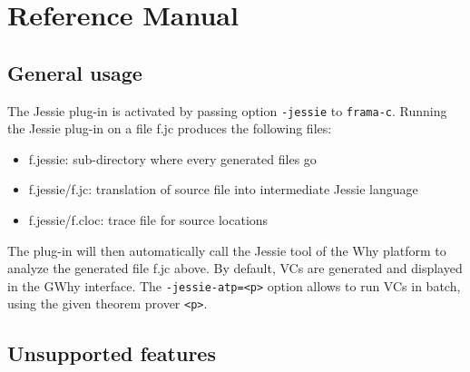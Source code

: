 \documentclass[a4paper,11pt,twoside,openright]{report}
\begin{document}

% 


% 


\chapter{Reference Manual}

\section{General usage}

The Jessie plug-in is activated by passing option
\verb|-jessie| to \verb|frama-c|. Running the Jessie plug-in
on a file f.jc produces the following files:

\begin{itemize}
\item f.jessie: sub-directory where every generated files go
\item f.jessie/f.jc: translation of source file into intermediate Jessie language
\item f.jessie/f.cloc: trace file for source locations
\end{itemize}

The plug-in will then automatically call the Jessie tool of the Why
platform to analyze the generated file f.jc above. By default, VCs are
generated and displayed in the GWhy interface. The
\verb|-jessie-atp=<p>| option allows to run VCs in batch, using the
given theorem prover \texttt{<p>}.


\section{Unsupported features}
\end{document}
